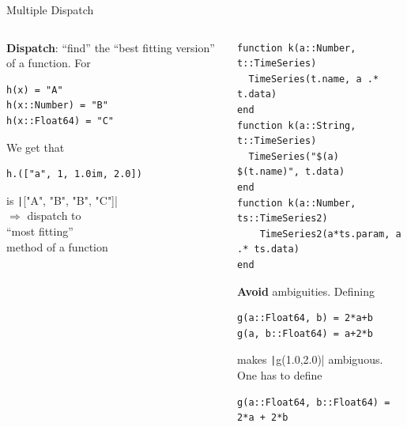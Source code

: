\documentclass[aspectratio=169, 11pt, handout]{beamer}
\begin{document}
    \begin{frame}[fragile]{Multiple Dispatch}
        \begin{columns}[T]
            \begin{column}{.37\textwidth}
                \textbf{Dispatch}: “find” the “best fitting version”
                of a function.
                \pause For
                \\
                \begin{verbatim}
h(x) = "A"
h(x::Number) = "B"
h(x::Float64) = "C"
                \end{verbatim}
                \pause
                \vspace{\baselineskip}
                We get that
                \begin{verbatim}
h.(["a", 1, 1.0im, 2.0])
                \end{verbatim}
                is \texttt|["A", "B", "B", "C"]|
                \pause
                \\[\baselineskip]
                $\Rightarrow$ dispatch to\\
                “most fitting”\\
                \alert{method} of a \alert{function}
            \end{column}
            \begin{column}{.62\textwidth}
                \pause
                \vspace{-.25\baselineskip}
                \begin{verbatim}
function k(a::Number, t::TimeSeries)
  TimeSeries(t.name, a .* t.data)
end
function k(a::String, t::TimeSeries)
  TimeSeries("$(a) $(t.name)", t.data)
end
function k(a::Number, ts::TimeSeries2)
    TimeSeries2(a*ts.param, a .* ts.data)
end
                \end{verbatim}
                \pause
                \alert{\textbf{Avoid}} ambiguities. Defining
                \begin{verbatim}
g(a::Float64, b) = 2*a+b
g(a, b::Float64) = a+2*b
                \end{verbatim}
                makes \texttt|g(1.0,2.0)|
                \alert{ambiguous}.\\[.5\baselineskip]
                \pause One \alert{has to define}
                \begin{verbatim}
g(a::Float64, b::Float64) = 2*a + 2*b
                \end{verbatim}
            \end{column}
        \end{columns}
    \end{frame}
\end{document}

